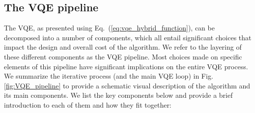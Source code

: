 \subsection{The VQE pipeline}

The VQE, as presented using Eq.~(\ref{eq:vqe_hybrid_function}), can be decomposed into a number of components, which all entail significant choices that impact the design and overall cost of the algorithm. We refer to the layering of these different components as the VQE pipeline. Most choices made on specific elements of this pipeline have significant implications on the entire VQE process. We summarize the iterative process (and the main VQE loop) in Fig. \ref{fig:VQE_pipeline} to provide a schematic visual description of the algorithm and its main components. We list the key components below and provide a brief introduction to each of them and how they fit together:


